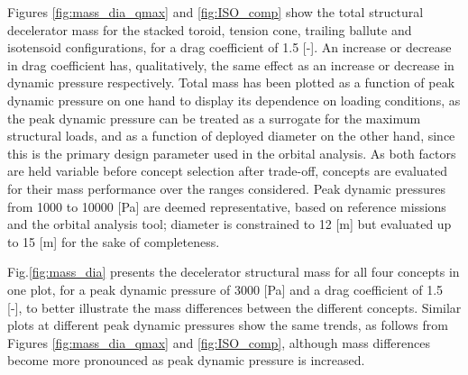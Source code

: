 
Figures \ref{fig:mass_dia_qmax} and \ref{fig:ISO_comp} show the total structural decelerator mass for the stacked toroid, tension cone, trailing ballute and isotensoid configurations, for a drag coefficient of 1.5 [-]. An increase or decrease in drag coefficient has, qualitatively, the same effect as an increase or decrease in dynamic pressure respectively. Total mass has been plotted as a function of peak dynamic pressure on one hand to display its dependence on loading conditions, as the peak dynamic pressure can be treated as a surrogate for the maximum structural loads, and as a function of deployed diameter on the other hand, since this is the primary design parameter used in the orbital analysis. As both factors are held variable before concept selection after trade-off, concepts are evaluated for their mass performance over the ranges considered. Peak dynamic pressures from 1000 to 10000 [Pa] are deemed representative, based on reference missions and the orbital analysis tool; diameter is constrained to 12 [m] but evaluated up to 15 [m] for the sake of completeness. 

Fig.\ref{fig:mass_dia} presents the decelerator structural mass for all four concepts in one plot, for a peak dynamic pressure of 3000 [Pa] and a drag coefficient of 1.5 [-], to better illustrate the mass differences between the different concepts. Similar plots at different peak dynamic pressures show the same trends, as follows from Figures \ref{fig:mass_dia_qmax} and \ref{fig:ISO_comp}, although mass differences become more pronounced as peak dynamic pressure is increased.

